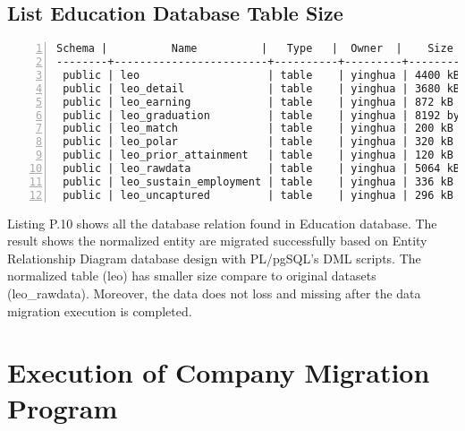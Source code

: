 \subsection{List Education Database Table Size}
\lstset{basicstyle=\ttfamily\tiny}  
\begin{lstlisting}[breaklines, frame=single, numbers=left, caption={List size of Education normalized table.}, label=commandline-02]
 Schema |          Name          |   Type   |  Owner  |    Size    | Line Counts 
--------+------------------------+----------+---------+------------+-------------
 public | leo                    | table    | yinghua | 4400 kB    | 32706	<- Same counts 
 public | leo_detail             | table    | yinghua | 3680 kB    | 32706		
 public | leo_earning            | table    | yinghua | 872 kB     | 14372
 public | leo_graduation         | table    | yinghua | 8192 bytes | 195
 public | leo_match              | table    | yinghua | 200 kB     | 3992
 public | leo_polar              | table    | yinghua | 320 kB     | 6793
 public | leo_prior_attainment   | table    | yinghua | 120 kB     | 2139
 public | leo_rawdata            | table    | yinghua | 5064 kB    | 32706	<- Same counts 
 public | leo_sustain_employment | table    | yinghua | 336 kB     | 6192
 public | leo_uncaptured         | table    | yinghua | 296 kB     | 6283

\end{lstlisting}

Listing P.10 shows all the database relation found in Education database. The result shows the normalized entity are migrated successfully based on Entity Relationship Diagram database design with PL/pgSQL's DML scripts. The normalized table (leo) has smaller size compare to original datasets (leo\_rawdata). Moreover, the data does not loss and missing after the data migration execution is completed. 

\newpage 

\section{Execution of Company Migration Program}

